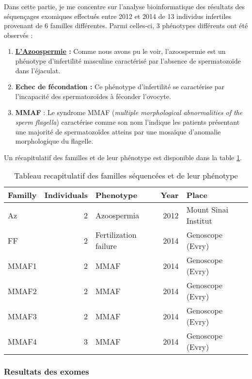 \documentclass[12pt,twoside]{reedthesis}
\providecommand{\tightlist}{%
  \setlength{\itemsep}{0pt}\setlength{\parskip}{0pt}}
\theoremstyle{definition}
\theoremstyle{definition}
\theoremstyle{remark}
\begin{document}
  Dans cette partie, je me concentre sur l'analyse bioinformatique des
  résultats des séquençages exomiques effectués entre 2012 et 2014 de 13
  individus infertiles provenant de 6 familles différentes. Parmi
  celles-ci, 3 phénotypes différents ont été observés :
  
  \begin{enumerate}
  \def\labelenumi{\arabic{enumi}.}
  \tightlist
  \item
    \textbf{\protect\hyperlink{infquant}{L'Azoospermie} :} Comme nous
    avons pu le voir, l'azoospermie est un phénotype d'infertilité
    masculine caractérisé par l'absence de spermatozoïde dans
    l'éjaculat.\\
  \item
    \textbf{Echec de fécondation :} Ce phénotype d'infertilité se
    caractérise par l'incapacité des spermatozoïdes à féconder
    l'ovocyte.\\
  \item
    \textbf{MMAF} : Le syndrome MMAF (\emph{multiple morphological
    abnormalities of the sperm flagella}) caractérise comme son nom
    l'indique les patients présentant une majorité de spermatozoïdes
    atteins par une mosaïque d'anomalie morphologique du flagelle.
  \end{enumerate}
  
  Un récapitulatif des familles et de leur phénotype est disponible dans
  la table \ref{tab:tabrecapfam}.
  
  \begin{longtable}[t]{lrlrl}
  \caption{\label{tab:tabrecapfam}Tableau recapitulatif des familles séquencées et de leur phénotype}\\
  \toprule
  Familly & Individuals & Phenotype & Year & Place\\
  \midrule
  Az & 2 & Azoospermia & 2012 & Mount Sinai Institut\\
  FF & 2 & Fertilization failure & 2014 & Genoscope (Evry)\\
  MMAF1 & 2 & MMAF & 2014 & Genoscope (Evry)\\
  MMAF2 & 2 & MMAF & 2014 & Genoscope (Evry)\\
  MMAF3 & 2 & MMAF & 2014 & Genoscope (Evry)\\
  MMAF4 & 3 & MMAF & 2014 & Genoscope (Evry)\\
  \bottomrule
  \end{longtable}
  
  \newpage  
  
  \subsubsection{Resultats des exomes}\label{resultats-des-exomes}
  
\end{document}
